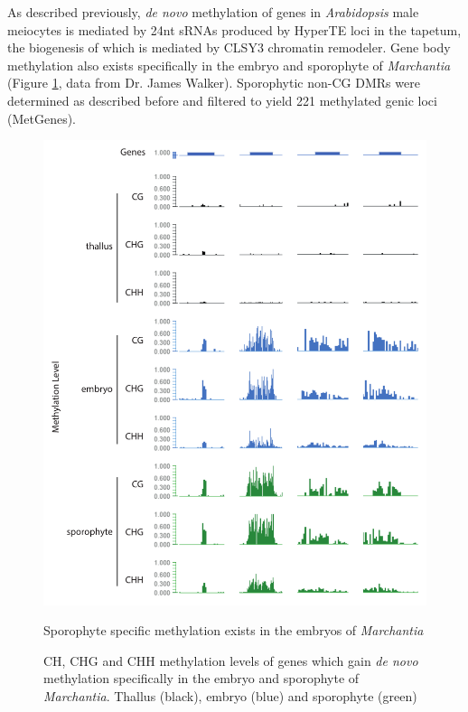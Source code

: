 As described previously, \textit{de novo} methylation of genes in \textit{Arabidopsis} male meiocytes is mediated by 24nt sRNAs produced by HyperTE loci in the tapetum, the biogenesis of which is mediated by CLSY3 chromatin remodeler. Gene body methylation also exists specifically in the embryo and sporophyte of \textit{Marchantia} (Figure \ref{fig:SLM_examples}, data from Dr. James Walker). Sporophytic non-CG DMRs were determined as described before\cite{jimmythesis} and filtered to yield 221 methylated genic loci (MetGenes).

\begin{figure}[htbp!] 
\centering    
    \includegraphics[width=1\textwidth]{Chapter3/Figs/Figure4_SLM_examples.pdf}
\caption{Sporophyte specific methylation exists in the embryos of \textit{Marchantia}}
\label{fig:SLM_examples}
\captionsetup{font=small}
    \caption*{CH, CHG and CHH methylation levels of genes which gain \textit{de novo} methylation specifically in the embryo and sporophyte of \textit{Marchantia}. Thallus (black), embryo (blue) and sporophyte (green)}
\end{figure}

